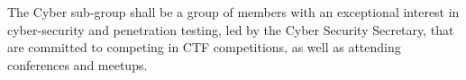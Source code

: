  The Cyber sub-group shall be a group of members with an exceptional interest in cyber-security and penetration testing, led by the Cyber Security Secretary, that are committed to competing in CTF competitions, as well as attending conferences and meetups. \\ 
